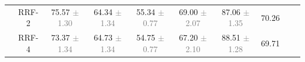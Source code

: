 \begin{table}
{\begin{tabular}{cccccccccc}
		& RRF-2 & \cellcolor{green!56.3!} 75.57 \textcolor{gray}{\scriptsize $\pm$ 1.30} & \cellcolor{red!35.6!} 64.34 \textcolor{gray}{\scriptsize $\pm$ 1.34} & \cellcolor{green!2.7!} 55.34 \textcolor{gray}{\scriptsize $\pm$ 0.77} & \cellcolor{green!80.0!} 69.00 \textcolor{gray}{\scriptsize $\pm$ 2.07} & \cellcolor{green!63.8!} 87.06 \textcolor{gray}{\scriptsize $\pm$ 1.35} & \cellcolor{green!70.3!} 70.26 \\
		& RRF-4 & \cellcolor{green!9.4!} 73.37 \textcolor{gray}{\scriptsize $\pm$ 1.34} & \cellcolor{red!15.7!} 64.73 \textcolor{gray}{\scriptsize $\pm$ 1.34} & \cellcolor{red!15.8!} 54.75 \textcolor{gray}{\scriptsize $\pm$ 0.77} & \cellcolor{green!75.6!} 67.20 \textcolor{gray}{\scriptsize $\pm$ 2.10} & \cellcolor{green!71.1!} 88.51 \textcolor{gray}{\scriptsize $\pm$ 1.28} & \cellcolor{green!66.3!} 69.71 \\
		\midrule
		

\end{tabular}}
\end{table}
